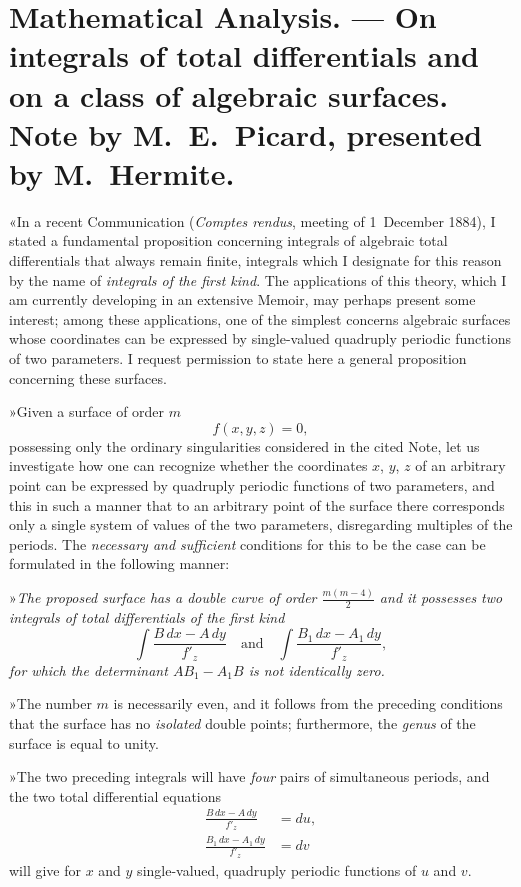 \documentclass{article}
\begin{document}
\section*{Mathematical Analysis. --- On integrals of total differentials and on a class of algebraic surfaces. Note by M.~E.~Picard, presented by M.~Hermite.}

«In a recent Communication (\emph{Comptes rendus}, meeting of 1~December 1884), I stated a fundamental proposition concerning integrals of algebraic total differentials that always remain finite, integrals which I designate for this reason by the name of \emph{integrals of the first kind}. The applications of this theory, which I am currently developing in an extensive Memoir, may perhaps present some
interest; among these applications, one of the simplest concerns algebraic surfaces whose coordinates can be expressed by single-valued quadruply periodic functions of two parameters. I request permission to state here a general proposition concerning these surfaces.

»Given a surface of order $m$
\[
f(x, y, z) = 0,
\]
possessing only the ordinary singularities considered in the cited Note, let us investigate how one can recognize whether the coordinates $x$, $y$, $z$ of an arbitrary point can be expressed by quadruply periodic functions of two parameters, and this in such a manner that to an arbitrary point of the surface there corresponds only a single system of values of the two parameters, disregarding multiples of the periods. The \emph{necessary and sufficient} conditions for this to be the case can be formulated in the following manner:

»\emph{The proposed surface has a double curve of order $\frac{m(m - 4)}{2}$ and it possesses two integrals of total differentials of the first kind}
\[
\int \frac{B\,dx - A\,dy}{f'_{z}} \quad\text{and}\quad \int \frac{B_{1}\,dx - A_{1}\,dy}{f'_{z}},
\]
\emph{for which the determinant $AB_{1} - A_{1}B$ is not identically zero.}

»The number $m$ is necessarily even, and it follows from the preceding conditions that the surface has no \emph{isolated} double points; furthermore, the \emph{genus} of the surface is equal to unity.

»The two preceding integrals will have \emph{four} pairs of simultaneous periods, and the two total differential equations
\[
\begin{aligned}
\frac{B\,dx - A\,dy}{f'_{z}} &= du, \\
\frac{B_{1}\,dx - A_{1}\,dy}{f'_{z}} &= dv
\end{aligned}
\]
will give for $x$ and $y$ single-valued, quadruply periodic functions of $u$ and $v$.
\end{document}
